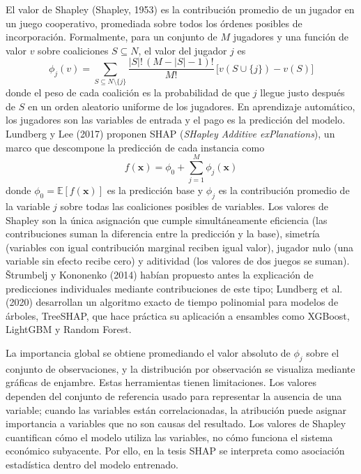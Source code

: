 El valor de Shapley (Shapley, 1953) es la contribución promedio de un jugador en un juego cooperativo, promediada sobre todos los órdenes posibles de incorporación. Formalmente, para un conjunto de $M$ jugadores y una función de valor $v$ sobre coaliciones $S\subseteq N$, el valor del jugador $j$ es
\begin{equation}
\phi_j(v) = \sum_{S\subseteq N\setminus\{j\}} \frac{|S|!\,(M-|S|-1)!}{M!}\,\big[v(S\cup\{j\})-v(S)\big]
\label{eq:shapley_formula}
\end{equation}
donde el peso de cada coalición es la probabilidad de que $j$ llegue justo después de $S$ en un orden aleatorio uniforme de los jugadores. En aprendizaje automático, los jugadores son las variables de entrada y el pago es la predicción del modelo. Lundberg y Lee (2017) proponen SHAP (\textit{SHapley Additive exPlanations}), un marco que descompone la predicción de cada instancia como
\begin{equation}
f(\mathbf{x}) = \phi_0 + \sum_{j=1}^M \phi_j(\mathbf{x})
\label{eq:shap}
\end{equation}
donde $\phi_0 = \mathbb{E}[f(\mathbf{x})]$ es la predicción base y $\phi_j$ es la contribución promedio de la variable $j$ sobre todas las coaliciones posibles de variables. Los valores de Shapley son la única asignación que cumple simultáneamente eficiencia (las contribuciones suman la diferencia entre la predicción y la base), simetría (variables con igual contribución marginal reciben igual valor), jugador nulo (una variable sin efecto recibe cero) y aditividad (los valores de dos juegos se suman). Štrumbelj y Kononenko (2014) habían propuesto antes la explicación de predicciones individuales mediante contribuciones de este tipo; Lundberg et al. (2020) desarrollan un algoritmo exacto de tiempo polinomial para modelos de árboles, TreeSHAP, que hace práctica su aplicación a ensambles como XGBoost, LightGBM y Random Forest.

La importancia global se obtiene promediando el valor absoluto de $\phi_j$ sobre el conjunto de observaciones, y la distribución por observación se visualiza mediante gráficas de enjambre. Estas herramientas tienen limitaciones. Los valores dependen del conjunto de referencia usado para representar la ausencia de una variable; cuando las variables están correlacionadas, la atribución puede asignar importancia a variables que no son causas del resultado. Los valores de Shapley cuantifican cómo el modelo utiliza las variables, no cómo funciona el sistema económico subyacente. Por ello, en la tesis SHAP se interpreta como asociación estadística dentro del modelo entrenado.

